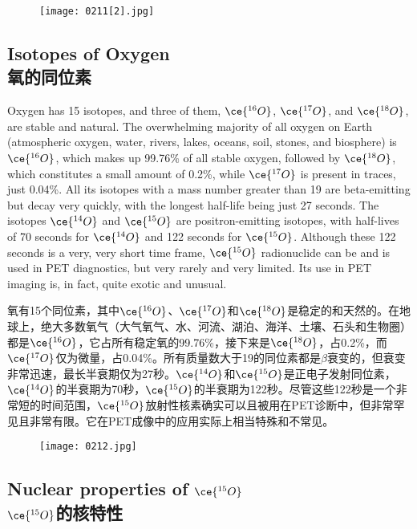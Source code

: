 \documentclass[dvipsnames, svgnames,a4paper,11pt]{article}
\begin{document}
\begin{figure}[h]
	\centering
    \texttt{[image: 0211[2].jpg]} 
     \label{fig263}
\end{figure}


\subsection{Isotopes of Oxygen \\氧的同位素}  
Oxygen has 15 isotopes, and three of them, \(\ce{^{16}O}\), \(\ce{^{17}O}\), and \(\ce{^{18}O}\), are stable and natural. The overwhelming majority of all oxygen on Earth (atmospheric oxygen, water, rivers, lakes, oceans, soil, stones, and biosphere) is \(\ce{^{16}O}\), which makes up 99.76\% of all stable oxygen, followed by \(\ce{^{18}O}\), which constitutes a small amount of 0.2\%, while \(\ce{^{17}O}\) is present in traces, just 0.04\%. All its isotopes with a mass number greater than 19 are beta-emitting but decay very quickly, with the longest half-life being just 27 seconds. The isotopes \(\ce{^{14}O}\) and \(\ce{^{15}O}\) are positron-emitting isotopes, with half-lives of 70 seconds for \(\ce{^{14}O}\) and 122 seconds for \(\ce{^{15}O}\). Although these 122 seconds is a very, very short time frame, \(\ce{^{15}O}\) radionuclide can be and is used in PET diagnostics, but very rarely and very limited. Its use in PET imaging is, in fact, quite exotic and unusual.

氧有15个同位素，其中\(\ce{^{16}O}\)、\(\ce{^{17}O}\)和\(\ce{^{18}O}\)是稳定的和天然的。在地球上，绝大多数氧气（大气氧气、水、河流、湖泊、海洋、土壤、石头和生物圈）都是\(\ce{^{16}O}\)，它占所有稳定氧的99.76\%，接下来是\(\ce{^{18}O}\)，占0.2\%，而\(\ce{^{17}O}\)仅为微量，占0.04\%。所有质量数大于19的同位素都是\(\beta\)衰变的，但衰变非常迅速，最长半衰期仅为27秒。\(\ce{^{14}O}\)和\(\ce{^{15}O}\)是正电子发射同位素，\(\ce{^{14}O}\)的半衰期为70秒，\(\ce{^{15}O}\)的半衰期为122秒。尽管这些122秒是一个非常短的时间范围，\(\ce{^{15}O}\)放射性核素确实可以且被用在PET诊断中，但非常罕见且非常有限。它在PET成像中的应用实际上相当特殊和不常见。

\begin{figure}[h]
	\centering
    \texttt{[image: 0212.jpg]}  
     \label{fig264}
\end{figure}

\subsection{Nuclear properties of \(\ce{^{15}O}\)\\ \(\ce{^{15}O}\)的核特性}  
\end{document}
